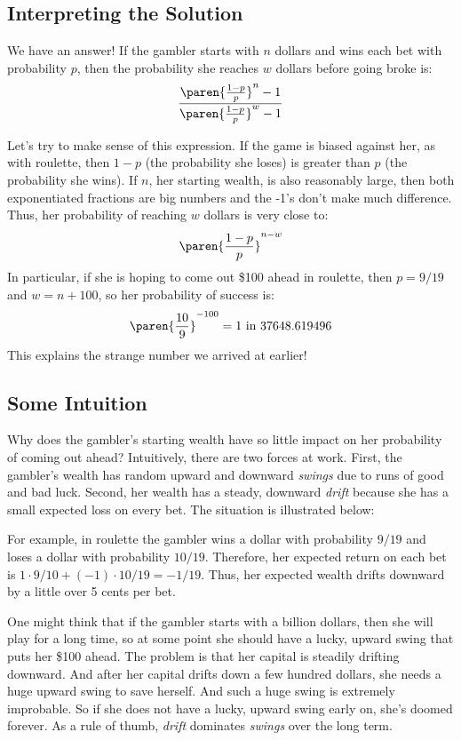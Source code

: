\subsection{Interpreting the Solution}

We have an answer!  If the gambler starts with $n$ dollars and wins
each bet with probability $p$, then the probability she reaches $w$
dollars before going broke is:
%
\[
\frac{\paren{\frac{1-p}{p}}^n-1}{\paren{\frac{1-p}{p}}^w-1}
\]

Let's try to make sense of this expression.  If the game is biased
against her, as with roulette, then $1-p$ (the probability she loses)
is greater than $p$ (the probability she wins).  If $n$, her starting
wealth, is also reasonably large, then both exponentiated fractions
are big numbers and the -1's don't make much difference.  Thus, her
probability of reaching $w$ dollars is very close to:
%
\[
\paren{\frac{1-p}{p}}^{n-w}
\]
%
In particular, if she is hoping to come out \$100 ahead in roulette,
then $p = 9/19$ and $w = n + 100$, so her probability of success is:
%
\[
\paren{\frac{10}{9}}^{-100} = 1 \text{ in } 37648.619496
\]
%
This explains the strange number we arrived at earlier!

\subsection{Some Intuition}

Why does the gambler's starting wealth have so little impact on her
probability of coming out ahead?  Intuitively, there are two forces at
work.  First, the gambler's wealth has random upward and downward
\emph{swings} due to runs of good and bad luck.  Second, her wealth
has a steady, downward \emph{drift} because she has a small expected
loss on every bet.  The situation is illustrated below:
%
\begin{figure}[h]
\end{figure}

For example, in roulette the gambler wins a dollar with probability
$9/19$ and loses a dollar with probability $10/19$.  Therefore, her
expected return on each bet is $1 \cdot 9/10 + (-1) \cdot 10/19 = -
1/19$.  Thus, her expected wealth drifts downward by a little over 5
cents per bet.

One might think that if the gambler starts with a billion dollars,
then she will play for a long time, so at some point she should have a
lucky, upward swing that puts her \$100 ahead.  The problem is that
her capital is steadily drifting downward.  And after her capital
drifts down a few hundred dollars, she needs a huge upward swing to
save herself.  And such a huge swing is extremely improbable.  So if
she does not have a lucky, upward swing early on, she's doomed
forever.  As a rule of thumb, \emph{drift} dominates \emph{swings}
over the long term.

